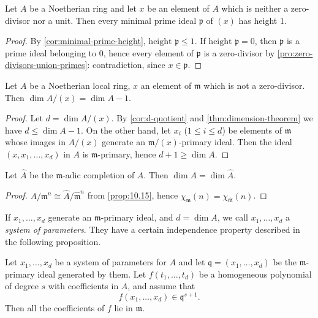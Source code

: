 \begin{corollary}\label{cor:principal-ideal}
Let $A$ be a Noetherian ring and let $x$ be an element of $A$ which is neither a zero-divisor nor a unit. Then every minimal prime ideal $\mathfrak{p}$ of $(x)$ has height 1.
\end{corollary}

\begin{proof}
By \eqref{cor:minimal-prime-height}, $\text{height } \mathfrak{p} \leq 1$. If $\text{height } \mathfrak{p} = 0$, then $\mathfrak{p}$ is a prime ideal belonging to 0, hence every element of $\mathfrak{p}$ is a zero-divisor by \eqref{pro:zero-divisors-union-primes}: contradiction, since $x \in \mathfrak{p}$.
\end{proof}

\begin{corollary}\label{cor:dim-quotient}
Let $A$ be a Noetherian local ring, $x$ an element of $\mathfrak{m}$ which is not a zero-divisor. Then $\dim A/(x) = \dim A - 1$.
\end{corollary}

\begin{proof}
Let $d = \dim A/(x)$. By \eqref{cor:d-quotient} and \eqref{thm:dimension-theorem} we have $d \leq \dim A - 1$. On the other hand, let $x_i$ ($1 \leq i \leq d$) be elements of $\mathfrak{m}$ whose images in $A/(x)$ generate an $\mathfrak{m}/(x)$-primary ideal. Then the ideal $(x, x_1, \ldots, x_d)$ in $A$ is $\mathfrak{m}$-primary, hence $d + 1 \geq \dim A$.
\end{proof}

\begin{corollary}\label{cor:dim-completion}
Let $\widehat{A}$ be the $\mathfrak{m}$-adic completion of $A$. Then $\dim A = \dim \widehat{A}$.
\end{corollary}

\begin{proof}
$A/\mathfrak{m}^n \cong \widehat{A}/\widehat{\mathfrak{m}}^n$ from \eqref{prop:10.15}, hence $\chi_{\mathfrak{m}}(n) = \chi_{\widehat{\mathfrak{m}}}(n)$.
\end{proof}

If $x_1, \ldots, x_d$ generate an $\mathfrak{m}$-primary ideal, and $d = \dim A$, we call $x_1, \ldots, x_d$ a \emph{system of parameters}. They have a certain independence property described in the following proposition.

\begin{proposition}\label{prop:system-parameters}
Let $x_1, \ldots, x_d$ be a system of parameters for $A$ and let $\mathfrak{q} = (x_1, \ldots, x_d)$ be the $\mathfrak{m}$-primary ideal generated by them. Let $f(t_1, \ldots, t_d)$ be a homogeneous polynomial of degree $s$ with coefficients in $A$, and assume that
\[
    f(x_1, \ldots, x_d) \in \mathfrak{q}^{s+1}.
\]
Then all the coefficients of $f$ lie in $\mathfrak{m}$.
\end{proposition}


